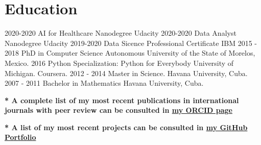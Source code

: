 \documentclass[]{friggeri-cv}
\begin{document}
\section{Education}
\begin{entrylist}
\entry
    {2020-2020}
    { AI for Healthcare Nanodegree}
    {Udacity}  {}
    \entry
    {2020-2020}
    { Data Analyst Nanodegree}
    {Udacity}  {}
\entry
    {2019-2020}
    { Data Sicence Professional Certificate}
    {IBM}  {}
\entry  
    {2015 - 2018}
    {PhD in Computer Science}
    {Autonomous University of the State of Morelos, Mexico.}  {}
    \entry
    {2016}
    {Python Specialization: Python for Everybody} {University of Michigan. Coursera.}{}
  \entry
    {2012 - 2014}
    {Master in Science.}
    {Havana University, Cuba.}{}
  \entry
    {2007 - 2011}
    {Bachelor in Mathematics}
    {Havana University,
    Cuba.}
     {}
\end{entrylist}

\textbf{* A complete list of my most recent publications in international journals with peer review can be  consulted in \href{https://orcid.org/0000-0001-6005-0702/}{my ORCID page}}

\textbf{* A  list of my most recent projects  can be  consulted in  \href{https://claudia-perez-ruisanchez.github.io/portfolio}{my GitHub Portfolio}}
\end{document}

